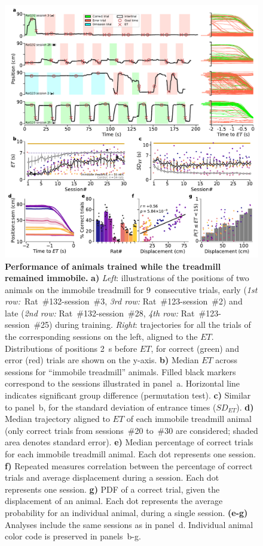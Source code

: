 \begin{figure}[!bt]
  \begin{center}
    \includegraphics[scale=1]{ch-time/figures/ImmTrd.pdf}
    \caption[Immobile Condition]
    {\textbf{Performance of animals trained while the treadmill remained immobile.}
    \textbf{a)}
    \textit{Left}: illustrations of the positions of two animals on the immobile treadmill for 9~consecutive trials, early (\textit{1st row:}~Rat~\#132-session~\#3, \textit{3rd row:} Rat~\#123-session~\#2) and late (\textit{2nd row:} Rat~\#132-session~\#28, \textit{4th row:} Rat~\#123-session~\#25) during training.
    \textit{Right}: trajectories for all the trials of the corresponding sessions on the left, aligned to the $ET$.
    Distributions of positions 2~s before $ET$, for correct (green) and error (red) trials are shown on the y-axis.
    \textbf{b)}
    Median $ET$ across sessions for ``immobile treadmill'' animals.
    Filled black markers correspond to the sessions illustrated in panel~a.
    Horizontal line indicates significant group difference (permutation test).
    \textbf{c)}
    Similar to panel~b, for the standard deviation of entrance times ($SD_{ET}$).
    \textbf{d)}
    Median trajectory aligned to $ET$ of each immobile treadmill animal (only correct trials from sessions~\#20 to~\#30 are considered; shaded area denotes standard error).
    \textbf{e)}
    Median percentage of correct trials for each immobile treadmill animal.
    Each dot represents one session.
    \textbf{f)}
    Repeated measures correlation between the percentage of correct trials and average displacement during a session.
    Each dot represents one session.
    \textbf{g)}
    PDF of a correct trial, given the displacement of an animal.
    Each dot represents the average probability for an individual animal, during a single session.
    \textbf{(e-g)}
    Analyses include the same sessions as in panel~d.
    Individual animal color code is preserved in panels~b-g.
    }
    \label{fig:time:ImmTrd}
  \end{center}
\end{figure}